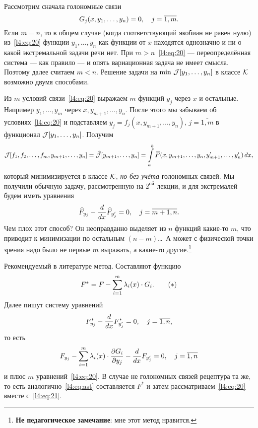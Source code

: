 \begin{enumerateD}
	Рассмотрим сначала голономные связи
	\begin{equation}
		\label{l4:eq:20}
		\hfill G_j(x,y_1,\ldots,y_n)=0,\quad j=\overline{1,m}.\hfill
	\end{equation}
	Если $m=n$, то в общем случае (когда соответствующий якобиан не равен нулю) из~\eqref{l4:eq:20} функции $y_1,\ldots,y_n$ как функции от $x$ находятся однозначно и ни о какой экстремальной задачи речи нет. При $m>n$~\eqref{l4:eq:20} --- переопределённая система --- как правило --- и опять вариационная задача не имеет смысла. Поэтому далее считаем $m<n$. Решение задачи на $\min\,\mathcal{J}[y_1,\ldots,y_n]$ в классе $\mathcal{K}$ возможно двумя способами. 
	\begin{enumerateD}
		\item Из $m$ условий связи~\eqref{l4:eq:20} выражаем $m$ функций $y_j$ через $x$ и остальные. Например $y_1,\ldots,y_m$ через $x,y_{m+1},\ldots,y_n$. После этого мы забываем об условиях~\eqref{l4:eq:20} и подставляем $y_j=f_j(x,y_{m+1},\ldots,y_{n})$, $j=\overline{1,m}$ в функционал $\mathcal{J}[y_1,\ldots,y_n]$. Получим
		\begin{equation*}
			\mathcal{J}[f_1,f_2,\ldots,f_m,y_{m+1},\ldots,y_n]=\widehat{\mathcal{J}}[y_{m+1},\ldots,y_n]=\int\limits_a^b \widehat{F}(x,y_{m+1},\ldots,y_n,y'_{m+1},\ldots,y'_n)\,dx,
		\end{equation*}  
		который минимизируется в классе $\mathcal{K}$, \emph{но без учёта} голономных связей. Мы получили обычную задачу, рассмотренную на $2^{\text{ой}}$  лекции, и для экстремалей будем иметь уравнения
		\begin{equation*}
			\hfill \widehat{F}_{y_j}-\der{}{x}\widehat{F}_{y'_j}=0,\quad j=\overline{m+1,n}.\hfill
		\end{equation*} 
		Чем плох этот способ? Он неоправданно выделяет из $n$ функций какие-то $m$, что приводит к минимизации по остальным $(n-m)$\dots\  А может с физической точки зрения надо было не первые $m$ выражать, а какие-то другие.\footnote{\textbf{Не педагогическое замечание}: мне этот метод нравится.}
		\item Рекомендуемый в литературе метод. Составляют функцию
		\begin{equation}
			\label{l4:eq:ast}
			\hfill F^{\ast}=F-\sum\limits_{i=1}^{m}\lambda_i(x)\cdot G_i.\tag{$\ast$}\hfill
		\end{equation} 
		Далее пишут систему уравнений
		\begin{equation}
			\label{l4:eq:21}
			\hfill F^{\ast}_{y_j}-\der{}{x}F^{\ast}_{y'_j}=0,\quad j=\overline{1,n},\hfill
		\end{equation}
		то есть 
		\begin{equation*}
			\hfill F_{y_j}-\sum\limits_{i=1}^m\lambda_i(x)\cdot\pder{G_i}{y_j}-\der{}{x}F_{y_j'}=0,\quad j=\overline{1,n}\hfill
		\end{equation*}
		и плюс $m$ уравнений~\eqref{l4:eq:20}.
		В случае не голономных связей рецептура та же, то есть аналогично~\eqref{l4:eq:ast} составляется $	F^{\ast}$ и затем рассматриваем~\eqref{l4:eq:20} вместе с~\eqref{l4:eq:21}.
	\end{enumerateD}
\end{enumerateD}

